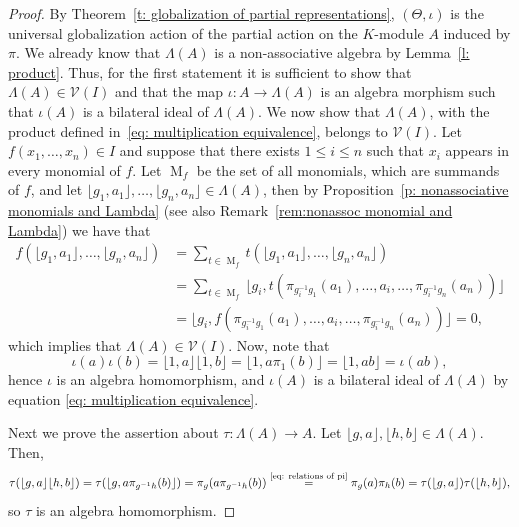 \documentclass[11pt]{amsart}
\numberwithin{equation}{section}
\theoremstyle{definition}
\theoremstyle{remark}
\begin{document}
\begin{proof}
   By Theorem~\ref{t: globalization of partial representations}, $(\Theta, \iota)$ is the universal globalization action of the partial action on the $K$-module $A$ induced by $\pi$. We already know that $\Lambda(A)$ is a non-associative algebra by Lemma~\ref{l: product}. Thus, for the first statement  it is sufficient to show that \(\Lambda(A) \in \mathcal{V}(I)\) and that the map \(\iota: A \to \Lambda(A)\) is an algebra morphism such that \(\iota(A)\) is a bilateral ideal of \(\Lambda(A)\).  We now show that $\Lambda(A)$, with the product defined in~\eqref{eq: multiplication equivalence}, belongs to $\mathcal{V}(I)$. Let $f(x_1, \ldots, x_n) \in I$ and suppose that there exists \(1 \leq i \leq n\)  such that $x_i$ appears in every monomial of $f$.
    Let \(\operatorname{M}_f\) be the set of all monomials,  which are summands of $f$,
    and let $\lfloor g_1, a_1 \rfloor, \ldots, \lfloor g_n, a_n \rfloor \in \Lambda(A)$, then  by Proposition~\ref{p: nonassociative monomials and Lambda} (see also Remark~\ref{rem:nonassoc monomial and Lambda}) we have that
    \begin{align*}
        f(\lfloor g_1, a_1 \rfloor, \ldots, \lfloor g_n, a_n \rfloor)
        &= \sum_{t \in \operatorname{M}_f} t( \lfloor g_1, a_1 \rfloor, \ldots, \lfloor g_n, a_n \rfloor) \\
        &= \sum_{t \in \operatorname{M}_f} \lfloor g_i, t(\pi_{g_i^{-1}g_1}(a_1), \ldots, a_i, \ldots, \pi_{g_i^{-1}g_n}(a_n)) \rfloor \\
        &= \lfloor g_i, f(\pi_{g_i^{-1}g_1}(a_1), \ldots, a_i, \ldots, \pi_{g_i^{-1}g_n}(a_n)) \rfloor = 0,
    \end{align*}
which implies that $\Lambda(A) \in \mathcal{V}(I)$. 
    Now, note that
    \[
        \iota(a)\iota(b) = \lfloor 1, a \rfloor \lfloor 1, b \rfloor = \lfloor 1, a \pi_{1}(b) \rfloor = \lfloor 1, ab \rfloor = \iota(ab),
    \]
    hence $\iota$ is an algebra homomorphism, and $\iota(A)$ is a bilateral ideal of $\Lambda(A)$ by equation \eqref{eq: multiplication equivalence}.

    Next we prove the assertion about $\tau: \Lambda(A) \to A$. Let $\lfloor g, a \rfloor, \lfloor h, b \rfloor \in \Lambda(A)$. Then,
    \[
       \tau(\lfloor g, a \rfloor \lfloor h, b \rfloor) = \tau(\lfloor g, a \pi_{g^{-1}h}(b) \rfloor)= \pi_g(a \pi_{g^{-1}h}(b))\overset{\scriptsize\eqref{eq: relations of pi}}{=}\pi_g(a) \pi_h(b) = \tau(\lfloor g, a \rfloor) \tau(\lfloor h, b \rfloor),
    \]
    so $\tau$ is an algebra homomorphism. 


\end{proof}
\end{document}

